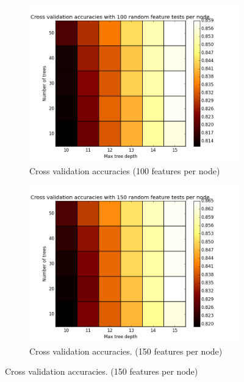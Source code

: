 \begin{figure}
	\centering
	\begin{subfigure}{0.4\textwidth}
		\centering
		\includegraphics[width=\textwidth]{plots/heatmap_xacc_100.png}
		\caption{\scriptsize Cross validation accuracies (100 features per node)}
		\label{subfig:result_heatmap_xacc_100}
	\end{subfigure}
  \hspace{0.05\textwidth}
	\begin{subfigure}{0.4\textwidth}
		\centering
		\includegraphics[width=\textwidth]{plots/heatmap_xacc_150.png}
		\caption{\scriptsize Cross validation accuracies. (150 features per node)}
		\label{subfig:result_heatmap_xacc_150}
	\end{subfigure}
  

\end{figure}
